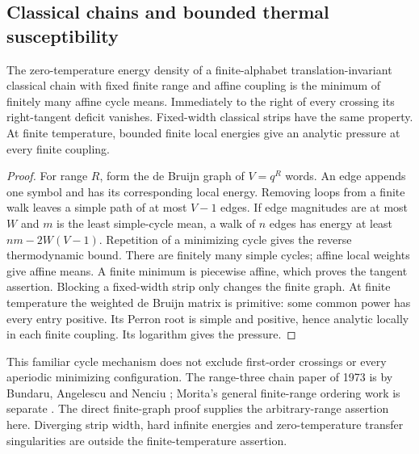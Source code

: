 \subsection{Classical chains and bounded thermal susceptibility}
\begin{proposition}\label{prop:chain-cycles}
The zero-temperature energy density of a finite-alphabet
translation-invariant classical chain with fixed finite range and
affine coupling is the minimum of finitely many affine cycle means.
Immediately to the right of every crossing its right-tangent
deficit vanishes. Fixed-width classical strips have the same property.
At finite temperature, bounded finite local energies give an
analytic pressure at every finite coupling.
\end{proposition}
\begin{proof}
For range $R$, form the de Bruijn graph of $V=q^R$ words. An edge
appends one symbol and has its corresponding local energy. Removing
loops from a finite walk leaves a simple path of at most $V-1$
edges. If edge magnitudes are at most $W$ and $m$ is the least
simple-cycle mean, a walk of $n$ edges has energy at least
$nm-2W(V-1)$. Repetition of a minimizing cycle gives the reverse
thermodynamic bound. There are finitely many simple cycles; affine
local weights give affine means. A finite minimum is piecewise affine,
which proves the tangent assertion. Blocking a fixed-width strip
only changes the finite graph. At finite temperature the weighted
de Bruijn matrix is primitive: some common power has every entry
positive. Its Perron root is simple and positive, hence analytic
locally in each finite coupling. Its logarithm gives the pressure.
\end{proof}
This familiar cycle mechanism does not exclude first-order crossings
or every aperiodic minimizing configuration. The range-three chain
paper of 1973 is by Bundaru, Angelescu and Nenciu \cite{isingChains};
Morita's general finite-range ordering work is separate
\cite{moritaChains}. The direct finite-graph proof supplies the
arbitrary-range assertion here. Diverging strip width, hard infinite
energies and zero-temperature transfer singularities are outside the
finite-temperature assertion.

